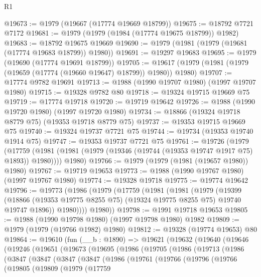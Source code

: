 \begin{lexlean}{R1}
\begin{coremodule}
@19673 := @1979 (@19667 (@17774 @19669 @18799))
@19675 := @18792 @7721 @7172
@19681 := @1979 (@1979 (@1984 (@17774 @19675 @18799)) @1982)
@19683 := @18792 @19675 @19669
@19690 := @1979 (@1981 (@1979 (@19681 (@17774 @19683 @18799)) @1980))
@19691 := @19297 @19683
@19695 := @1979 (@19690 (@17774 @19691 @18799))
@19705 := @19617 (@1979 (@1981 (@1979 (@19659 (@17774 (@19660 @19647) @18799)) @1980)) @1980)
@19707 := @17774 @9782 @19691
@19713 := @1988 (@1990 @19707 @1980) (@1997 @19707 @1980)
@19715 := @19328 @9782 @80
@19718 := @19324 @19715 @19669 @75
@19719 := @17774 @19718
@19720 := @19719 @19642
@19726 := @1988 (@1990 @19720 @1980) (@1997 @19720 @1980)
@19734 := @18866 (@19324 @19718 @8779 @75) (@19353 @19718 @8779 @75)
@19737 := @19353 @19715 @19669 @75
@19740 := @19324 @19737 @7721 @75
@19744 := @19734 (@19353 @19740 @1914 @75)
@19747 := @19353 @19737 @7721 @75
@19761 := @19726
    (@1979
      (@17759 (@1981 (@1981 (@1979 (@19346 (@19744 (@19353 @19747 @1917 @75) @1893)) @1980))))
      @1980)
@19766 := @1979 (@1979 (@1981 (@19657 @1980)) @1980)
@19767 := @19719 @19653
@19773 := @1988 (@1990 @19767 @1980) (@1997 @19767 @1980)
@19774 := @19328 @19718
@19775 := @19774 @19642
@19796 := @19773
    (@1986
      (@1979
        (@17759
          (@1981
            (@1981
              (@1979
                (@19399
                  (@18866 (@19353 @19775 @8255 @75) (@19324 @19775 @8255 @75) @19740 @19747 @1896))
                @1980))))
        @1980))
@19798 := @1991 @19718 @19653
@19805 := @1988 (@1990 @19798 @1980) (@1997 @19798 @1980) @1982
@19809 := @1979 (@1979 (@19766 @1982) @1980)
@19812 := @19328 (@19774 @19653) @80
@19864 := @19610
    (fun (__b : @1890) =>
    @19621
      (@19632
        (@19640
          (@19646
            (@19246
              (@19651
                (@19673
                  (@19695
                    (@1986
                      (@19705
                        (@1986
                          (@19713
                            (@1986
                              (@3847
                                (@3847
                                  (@3847
                                    (@3847
                                      (@1986
                                        (@19761
                                          (@19766
                                            (@19796
                                              (@19766
                                                (@19805
                                                  (@19809
                                                    (@1979
                                                      (@17759

\end{coremodule}
\end{lexlean}
